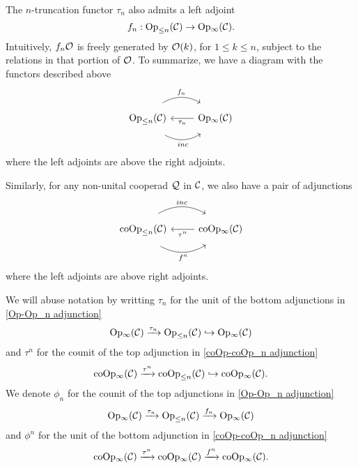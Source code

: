 \clearpage
The $n$-truncation functor $\tau_n$  
also admits a left adjoint 
$$f_n: \operatorname{Op}_{\leq n}({\mathcal{C}}) \to \operatorname{Op_{\infty}}({\mathcal{C}}).$$ 
Intuitively, $f_n {\mathcal{O}}$ is freely generated by ${\mathcal{O}}(k)$, for $1\leq k \leq n$, subject to the relations in that portion of ${\mathcal{O}}$.
To summarize, we have a diagram with the functors described above
\begin{equation}
\label{Op-Op_n adjunction}
	\begin{tikzcd}
\operatorname{Op}_{\leq n}(\CC) & \Opd(\CC)
	\arrow[from=1-1, to= 1-2,bend left, shift left = 3, "f_n"]
	\arrow[from=1-1, to=1-2, bend right, shift right = 3, "inc" below]
	\arrow[from=1-2, to=1-1, "\tau_n"]
\end{tikzcd}
\end{equation}
where the left adjoints are above the right adjoints.

Similarly, for any non-unital cooperad ${\mathcal{Q}}$ in ${\mathcal{C}}$, we also have a pair of adjunctions
\begin{equation}
\label{coOp-coOp_n adjunction}
	\begin{tikzcd}
\operatorname{coOp}_{\leq n}(\CC) & \Coop(\CC)
	\arrow[from=1-1, to= 1-2,bend left, shift left = 3, "inc"]
	\arrow[from=1-1, to=1-2, bend right, shift right = 3, "f^n" below]
	\arrow[from=1-2, to=1-1, "\tau^n"]
\end{tikzcd}
\end{equation}
where the left adjoints are above right adjoints. 

\begin{notation}
	We will abuse notation by writting $\tau_{n}$ for the unit of the bottom adjunctions in \eqref{Op-Op_n adjunction}
	$$
	\operatorname{Op_{\infty}}({\mathcal{C}})  
	\xrightarrow{\tau_n}
	\operatorname{Op}_{\leq n}({\mathcal{C}})
	\hookrightarrow
	\operatorname{Op_{\infty}}({\mathcal{C}})
	$$
	and $\tau^n$ for the counit of the top adjunction in \eqref{coOp-coOp_n adjunction}
	$$
	\operatorname{coOp_{\infty}}({\mathcal{C}}) 
	\xrightarrow{\tau^n}
	\operatorname{coOp}_{\leq n}({\mathcal{C}})
	\hookrightarrow
	\operatorname{coOp_{\infty}}({\mathcal{C}}).
	$$
	We denote  $\phi_n$ for the counit of the top adjunctions in \eqref{Op-Op_n adjunction}
	$$
	\operatorname{Op_{\infty}}({\mathcal{C}})  
	\xrightarrow{\tau_n}
	\operatorname{Op}_{\leq n}({\mathcal{C}})
	\xrightarrow{f_n}
	\operatorname{Op_{\infty}}({\mathcal{C}})
	$$
	and $\phi^n$ for the unit of the bottom adjunction in \eqref{coOp-coOp_n adjunction}
	$$
	\operatorname{coOp_{\infty}}({\mathcal{C}}) 
	\xrightarrow{\tau^n}
	\operatorname{coOp_{\infty}}({\mathcal{C}})
	\xrightarrow{f^n}
	\operatorname{coOp_{\infty}}({\mathcal{C}}).
	$$
\end{notation}

